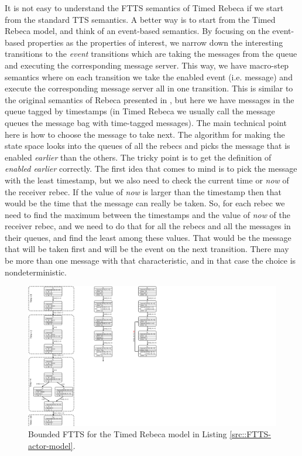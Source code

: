 It is not easy to understand the FTTS semantics of Timed Rebeca if we start from the standard TTS semantics. A better way is to start from the Timed Rebeca model, and think of an event-based semantics. By focusing on the event-based properties as the properties of interest, we narrow down the interesting transitions to the \textit{event} transitions which are taking the messages from the queue and executing the corresponding message server.
This way, we have macro-step semantics where on each transition we take the enabled event (i.e. message) and execute the corresponding message server all in one transition. This is similar to the original semantics of Rebeca presented in \cite{DBLP:journals/fuin/SirjaniMSB04}, but here we have messages in the queue tagged by timestamps (in Timed Rebeca we usually call the message queues the message bag with time-tagged messages). The main technical point here is how to choose the message to take next. The algorithm for making the state space looks into the queues of all the rebecs and picks the message that is enabled \textit{earlier} than the others.  The tricky point is to get the definition of \textit{enabled earlier} correctly. The first idea that comes to mind is to pick the message with the least timestamp, but we also need to check the current time or \textit{now} of the receiver rebec. If the value of \textit{now} is larger than the timestamp then that would be the time that the message can really be taken. So,  for each rebec we need to find the maximum between  the timestamps and the value of  \textit{now} of the receiver rebec, and we need to do that for all the rebecs and all the messages in their queues,  and find the least among these values. That would be the message that will be taken first and will be the event on the next transition. There may be more than one message with that characteristic, and in that case the choice is nondeterministic.



\begin{figure}
\centering
\includegraphics[width=.15\textwidth]{resources/BFTTS.pdf}
\caption{ Bounded FTTS for the Timed Rebeca model in Listing \ref{src::FTTS-actor-model}.}
\label{fig::BFTTS}
\end{figure}

